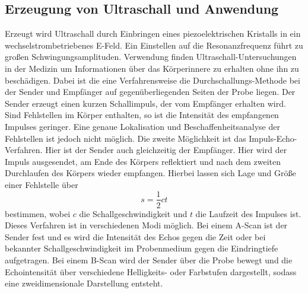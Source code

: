 \subsection{Erzeugung von Ultraschall und Anwendung}
Erzeugt wird Ultraschall durch Einbringen eines piezoelektrischen Kristalls in ein wechselstrombetriebenes E-Feld. Ein Einstellen auf die Resonanzfrequenz führt zu großen Schwingungsamplituden.\newline
Verwendung finden Ultraschall-Untersuchungen in der Medizin um Informationen über das Körperinnere zu erhalten ohne ihn zu beschädigen.\newline
Dabei ist die eine Verfahrensweise die Durchschallungs-Methode bei der Sender und Empfänger auf gegenüberliegenden Seiten der Probe liegen. Der Sender erzeugt einen kurzen Schallimpuls, der vom Empfänger erhalten wird. Sind Fehlstellen im Körper enthalten, so ist die Intensität des empfangenen Impulses geringer. Eine genaue Lokalisation und Beschaffenheitsanalyse der Fehlstellen ist jedoch nicht möglich.\newline
Die zweite Möglichkeit ist das Impuls-Echo-Verfahren.
Hier ist der Sender auch gleichzeitig der Empfänger. Hier wird der Impuls ausgesendet, am Ende des Körpers reflektiert und nach dem zweiten Durchlaufen des Körpers wieder empfangen.
Hierbei lassen sich Lage und Größe einer Fehlstelle über 
\begin{equation}
s=\frac{1}{2}c t
\end{equation}
bestimmen, wobei $c$ die Schallgeschwindigkeit und $t$ die Laufzeit des Impulses ist. Dieses Verfahren ist in verschiedenen Modi möglich.
Bei einem A-Scan ist der Sender fest und es wird die Intensität des Echos gegen die Zeit oder bei bekannter Schallgeschwindigkeit im Probenmedium gegen die Eindringtiefe aufgetragen.
Bei einem B-Scan wird der Sender über die Probe bewegt und die Echointensität über verschiedene Helligkeits- oder Farbstufen dargestellt, sodass eine zweidimensionale Darstellung entsteht.

